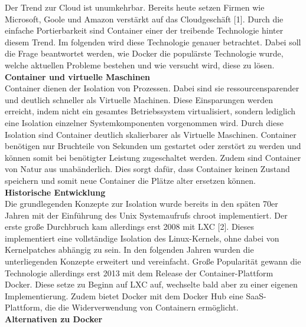 \begin{multicols}{2}
Der Trend zur Cloud ist unumkehrbar. Bereits heute setzen Firmen wie Microsoft, Goole und Amazon verstärkt auf das Cloudgeschäft [1]. Durch die einfache Portierbarkeit sind Container einer der treibende Technologie hinter diesem Trend. Im folgenden wird diese Technologie genauer betrachtet. Dabei soll die Frage beantwortet werden, wie Docker die populärste Technologie wurde, welche aktuellen Probleme bestehen und wie versucht wird, diese zu lösen.\\

\textbf{Container und virtuelle Maschinen} \\


Container dienen der Isolation von Prozessen. Dabei sind sie ressourcensparender und deutlich schneller als Virtuelle Machinen. Diese Einsparungen werden erreicht, indem nicht ein gesamtes Betriebssystem virtualisiert, sondern lediglich eine Isolation einzelner Systemkomponenten vorgenommen wird.
\bildbreit
\bildI
\bildschmal
Durch diese Isolation sind Container deutlich skalierbarer als Virtuelle Maschinen. Container benötigen nur Bruchteile von Sekunden um gestartet oder zerstört zu werden und können somit bei benötigter Leistung zugeschaltet werden. Zudem sind Container von Natur aus unabänderlich. Dies sorgt dafür, dass Container keinen Zustand speichern und somit neue Container die Plätze alter ersetzen können.\\

 \textbf{Historische Entwicklung} \\


Die grundlegenden Konzepte zur Isolation wurde bereits in den späten 70er Jahren mit der Einführung des Unix Systemaufrufs chroot implementiert. Der erste große Durchbruch kam allerdings erst 2008 mit LXC [2]. Dieses implementiert eine vollständige Isolation des Linux-Kernels, ohne dabei von Kernelpatches abhängig zu sein.
\bildbreit
\bildII
\bildschmal
In den folgenden Jahren wurden die unterliegenden Konzepte erweitert und vereinfacht. Große Popularität gewann die Technologie allerdings erst 2013 mit dem Release der Container-Plattform Docker. Diese setze zu Beginn auf LXC auf, wechselte bald aber zu einer eigenen Implementierung. Zudem bietet Docker mit dem Docker Hub eine SaaS-Plattform, die die Widerverwendung von Containern ermöglicht.\\

 \textbf{Alternativen zu Docker} \\



\end{multicols}
